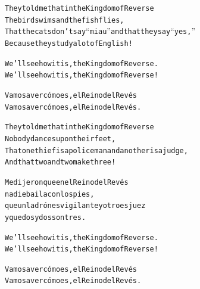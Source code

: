 \documentclass[11pt]{article}
\begin{document}
\begin{parcolumns}[distance=8em,nofirstindent=true]{2}

\colchunk
{
\begin{alltt}\normalfont
They told me that in the Kingdom of Reverse
The bird swims and the fish flies,
That the cats don’t say “miau” and that they say “yes,”
Because they study a lot of English!
\end{alltt}
}


\colplacechunks

\colchunk
{
\begin{alltt}\normalfont
We’ll see how it is, the Kingdom of Reverse.
We’ll see how it is, the Kingdom of Reverse!
\end{alltt}
}

\colchunk
{
\begin{alltt}\normalfont
Vamos a ver cómo es, el Reino del Revés
Vamos a ver cómo es, el Reino del Revés.
\end{alltt}
}

\colplacechunks

\colchunk
{
\begin{alltt}\normalfont
They told me that in the Kingdom of Reverse
Nobody dances upon their feet,
That one thief is a policeman and another is a judge,
And that two and two make three!
\end{alltt}
}

\colchunk
{
\begin{alltt}\normalfont
Me dijeron que en el Reino del Revés
nadie baila con los pies,
que un ladrón es vigilante y otro es juez
y que dos y dos son tres.
\end{alltt}
}

\colplacechunks

\colchunk
{
\begin{alltt}\normalfont
We’ll see how it is, the Kingdom of Reverse.
We’ll see how it is, the Kingdom of Reverse!
\end{alltt}
}

\colchunk
{
\begin{alltt}\normalfont
Vamos a ver cómo es, el Reino del Revés
Vamos a ver cómo es, el Reino del Revés.
\end{alltt}
}


\end{parcolumns}
\end{document}

